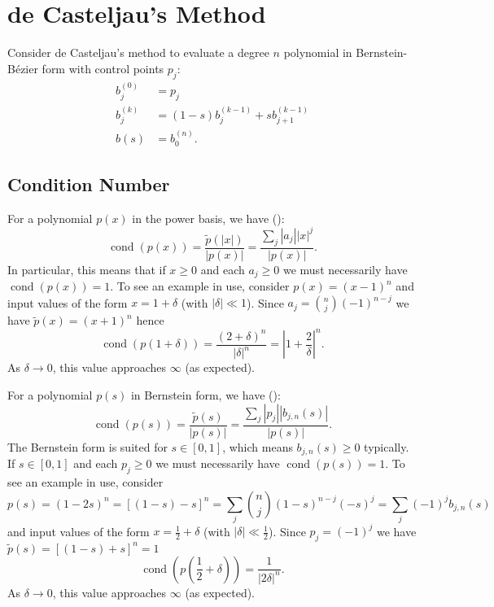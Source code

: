 \documentclass[letterpaper,10pt]{article}
\newcommand{\cond}[1]{\operatorname{cond}\left(#1\right)}
\begin{document}
\section{de Casteljau's Method}

Consider de Casteljau's method to evaluate a degree \(n\)
polynomial in Bernstein-B\'{e}zier form with control points \(p_j\):
\begin{align*}
    b_j^{(0)} &= p_j \\
    b_j^{(k)} &= (1 - s) b_j^{(k - 1)} + s b_{j + 1}^{(k - 1)} \\
    b(s) &= b_0^{(n)}.
\end{align*}

\subsection{Condition Number}

For a polynomial \(p(x)\) in the power basis, we have
(\cite{langlois_et_al:DSP:2006:442}):
\[\cond{p(x)} = \frac{\widetilde{p}\left(\left|x\right|\right)}{
  \left|p(x)\right|} = \frac{\sum_j \left|a_j\right| \left|x\right|^j}{
  \left|p(x)\right|}.\]
In particular, this means that if \(x \geq 0\) and each \(a_j \geq 0\)
we must necessarily have \(\cond{p(x)} = 1\). To see an example in use,
consider \(p(x) = (x - 1)^n\) and input values of the form \(x = 1 + \delta\)
(with \(\left|\delta\right| \ll 1\)). Since \(a_j = \binom{n}{j} (-1)^{n - j}\)
we have \(\widetilde{p}(x) = (x + 1)^n\) hence
\[\cond{p\left(1 + \delta\right)} = \frac{(2 + \delta)^n}{
  \left|\delta\right|^n} = \left|1 + \frac{2}{\delta}\right|^n.\]
As \(\delta \to 0\), this value approaches \(\infty\) (as expected).

For a polynomial \(p(s)\) in Bernstein form, we have (\cite{Jiang2010}):
\[\cond{p(s)} = \frac{\widetilde{p}\left(s\right)}{
  \left|p(s)\right|} = \frac{\sum_j \left|p_j\right| \left|b_{j, n}(s)\right|}{
  \left|p(s)\right|}.\]
The Bernstein form is suited for \(s \in \left[0, 1\right]\), which means
\(b_{j, n}(s) \geq 0\) typically. If \(s \in \left[0, 1\right]\) and each
\(p_j \geq 0\) we must necessarily have \(\cond{p(s)} = 1\). To see an
example in use, consider
\[p(s) = (1 - 2s)^n = \left[(1 - s) - s\right]^n = \sum_j \binom{n}{j}
(1 - s)^{n - j} (-s)^j = \sum_j (-1)^j b_{j, n}(s)\]
and input values of the form \(x = \frac{1}{2} + \delta\)
(with \(\left|\delta\right| \ll \frac{1}{2}\)). Since \(p_j = (-1)^j\)
we have \(\widetilde{p}(s) = \left[(1 - s) + s\right]^n = 1\)
\[\cond{p\left(\frac{1}{2} + \delta\right)} = \frac{1}{
  \left|2\delta\right|^n}.\]
As \(\delta \to 0\), this value approaches \(\infty\) (as expected).
\end{document}
